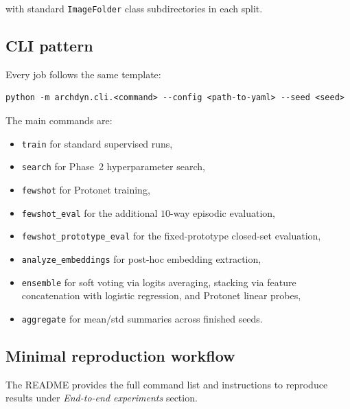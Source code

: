 \documentclass[12pt,a4paper]{article}
\begin{document}
with standard \texttt{ImageFolder} class subdirectories in each split.

\subsection{CLI pattern}
\label{subsec:cli-pattern}

Every job follows the same template:

\begin{verbatim}
python -m archdyn.cli.<command> --config <path-to-yaml> --seed <seed>
\end{verbatim}

The main commands are:

\begin{itemize}[nosep]
    \item \texttt{train} for standard supervised runs,
    \item \texttt{search} for Phase~2 hyperparameter search,
    \item \texttt{fewshot} for Protonet training,
    \item \texttt{fewshot\_eval} for the additional $10$-way episodic evaluation,
    \item \texttt{fewshot\_prototype\_eval} for the fixed-prototype closed-set evaluation,
    \item \texttt{analyze\_embeddings} for post-hoc embedding extraction,
    \item \texttt{ensemble} for soft voting via logits averaging, stacking via feature concatenation with logistic regression, and Protonet linear probes,
    \item \texttt{aggregate} for mean/std summaries across finished seeds.
\end{itemize}

\subsection{Minimal reproduction workflow}
\label{subsec:reproduction}

The README provides the full command list and instructions to reproduce results under \textit{End-to-end experiments} section.
\end{document}
